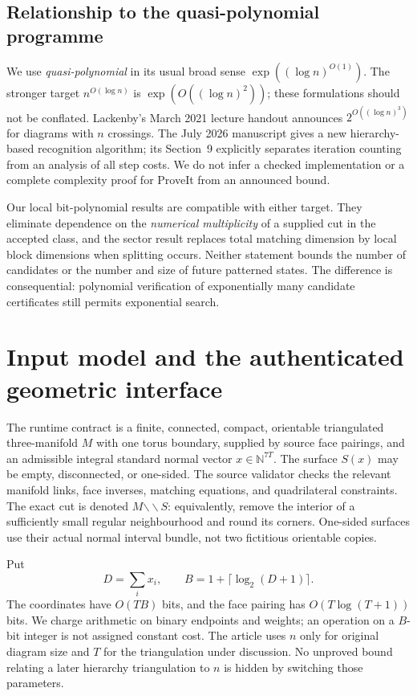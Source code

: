 \documentclass[11pt,a4paper]{article}
\theoremstyle{definition}
\newcommand{\N}{\mathbb N}
\newcommand{\cut}{\mathbin{\backslash\!\backslash}}
\begin{document}
\subsection{Relationship to the quasi-polynomial programme}

We use \emph{quasi-polynomial} in its usual broad sense
$\exp((\log n)^{O(1)})$.  The stronger target $n^{O(\log n)}$ is
$\exp(O((\log n)^2))$; these formulations should not be conflated.
Lackenby's March 2021 lecture handout announces
$2^{O((\log n)^3)}$ for diagrams with $n$ crossings\cite{Lackenby2021}.
The July 2026 manuscript gives a new hierarchy-based recognition algorithm;
its Section~9 explicitly separates iteration counting from an analysis of all
step costs\cite{Lackenby2026}.  We do not infer a checked implementation or a
complete complexity proof for ProveIt from an announced bound.

Our local bit-polynomial results are compatible with either target.  They
eliminate dependence on the \emph{numerical multiplicity} of a supplied cut in
the accepted class, and the sector result replaces total matching dimension
by local block dimensions when splitting occurs.  Neither statement bounds
the number of candidates or the number and size of future patterned states.
The difference is consequential: polynomial verification of exponentially
many candidate certificates still permits exponential search.

\section{Input model and the authenticated geometric interface}
\label{main:model}

The runtime contract is a finite, connected, compact, orientable triangulated
three-manifold $M$ with one torus boundary, supplied by source face pairings,
and an admissible integral standard normal vector
$x\in\N^{7T}$.  The surface $S(x)$ may be empty, disconnected, or one-sided.
The source validator checks the relevant manifold links, face inverses,
matching equations, and quadrilateral constraints.  The exact cut is denoted
$M\cut S$: equivalently, remove the interior of a sufficiently small regular
neighbourhood and round its corners.  One-sided surfaces use their actual
normal interval bundle, not two fictitious orientable copies.

Put
\[
 D=\sum_i x_i,\qquad B=1+\lceil\log_2(D+1)\rceil.
\]
The coordinates have $O(TB)$ bits, and the face pairing has $O(T\log(T+1))$
bits.  We charge arithmetic on binary endpoints and weights; an operation on
a $B$-bit integer is not assigned constant cost.  The article uses $n$ only
for original diagram size and $T$ for the triangulation under discussion.
No unproved bound relating a later hierarchy triangulation to $n$ is hidden
by switching those parameters.
\end{document}

